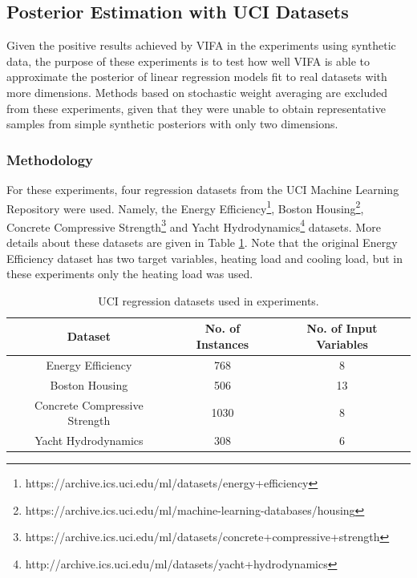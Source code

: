 \documentclass[msc,deptreport.inf]{infthesis} %
\begin{document}
\subsection{Posterior Estimation with UCI Datasets}

Given the positive results achieved by VIFA in the experiments using synthetic data, the purpose of these experiments is to test how well VIFA is able to approximate the posterior of linear regression models fit to real datasets with more dimensions. Methods based on stochastic weight averaging are excluded from these experiments, given that they were unable to obtain representative samples from simple synthetic posteriors with only two dimensions. 

\subsubsection{Methodology}

For these experiments, four regression datasets from the UCI Machine Learning Repository \cite{dua2019} were used. Namely, the Energy Efficiency\footnote{https://archive.ics.uci.edu/ml/datasets/energy+efficiency}, Boston Housing\footnote{https://archive.ics.uci.edu/ml/machine-learning-databases/housing}, Concrete Compressive Strength\footnote{https://archive.ics.uci.edu/ml/datasets/concrete+compressive+strength} and Yacht Hydrodynamics\footnote{http://archive.ics.uci.edu/ml/datasets/yacht+hydrodynamics} datasets. More details about these datasets are given in Table \ref{table:uci_datasets}. Note that the original Energy Efficiency dataset has two target variables, heating load and cooling load, but in these experiments only the heating load was used. 

\begin{table}[h!]
	\begin{center}
		\begin{tabular}{||c c c ||} 
			\hline
 			Dataset & No. of Instances & No. of Input Variables \\ [0.5ex] 
			\hline\hline
			Energy Efficiency 				& 768 	& 8 \\
 			\hline
 			Boston Housing 				& 506 	& 13 \\ 
 			\hline
 			Concrete Compressive Strength 	& 1030 	& 8 \\
 			\hline
 			Yacht Hydrodynamics 			& 308 	& 6 \\ [1ex] 
 			\hline
		\end{tabular}
		\caption{UCI regression datasets used in experiments.}
		\label{table:uci_datasets}
	\end{center}
\end{table}
\end{document}
